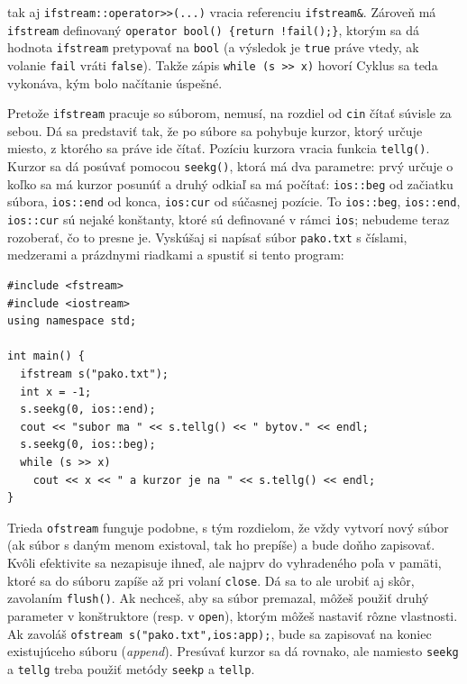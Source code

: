 \documentclass[10pt]{article}
\def\prg{\lstinline}
\def\ods{\vspace*{10pt}}
\begin{document}
{tak aj \prg!ifstream::operator>>(...)! vracia referenciu \prg!ifstream&!. Zároveň
má \prg!ifstream! definovaný \prg~operator bool() {return !fail();}~, ktorým sa dá hodnota
\prg!ifstream! pretypovať na \prg!bool! (a výsledok je \prg!true! práve vtedy,
ak volanie \prg!fail! vráti \prg!false!). Takže zápis \prg!while (s >> x)! hovorí
 Cyklus sa teda vykonáva, kým bolo načítanie úspešné.

\ods
Pretože \prg!ifstream! pracuje so súborom, nemusí, na rozdiel od \prg!cin! čítať súvisle
za sebou. Dá sa predstaviť tak, že po súbore sa pohybuje kurzor, ktorý určuje miesto, z ktorého
sa práve ide čítať. Pozíciu kurzora vracia funkcia \prg!tellg()!. Kurzor sa dá posúvať
pomocou \prg!seekg()!, ktorá má dva parametre: prvý určuje o koľko sa má kurzor posunúť
a druhý odkiaľ sa má počítať: \prg!ios::beg! od začiatku súbora, \prg!ios::end! od konca, 
\prg!ios:cur! od súčasnej pozície. 
To \prg!ios::beg!, \prg!ios::end!, \prg!ios::cur! sú nejaké
konštanty, ktoré sú definované
v rámci {\tt ios}; nebudeme teraz rozoberať, čo to presne je.
Vyskúšaj si napísať súbor {\tt pako.txt} s číslami,
medzerami a prázdnymi riadkami a spustiť si tento program:

\begin{lstlisting}
#include <fstream>
#include <iostream>
using namespace std;

int main() {
  ifstream s("pako.txt");
  int x = -1;
  s.seekg(0, ios::end);
  cout << "subor ma " << s.tellg() << " bytov." << endl;
  s.seekg(0, ios::beg);
  while (s >> x)
    cout << x << " a kurzor je na " << s.tellg() << endl;
}
\end{lstlisting}

\ods
Trieda \prg!ofstream! funguje podobne, 
s tým rozdielom, že vždy vytvorí nový súbor (ak súbor s daným
menom existoval, tak ho prepíše) a bude doňho zapisovať. Kvôli efektivite sa nezapisuje ihneď,
ale najprv do vyhradeného poľa v pamäti, ktoré sa do súboru zapíše až pri volaní \prg!close!.
Dá sa to ale urobiť aj skôr, zavolaním \prg!flush()!. Ak nechceš, aby sa súbor premazal,
môžeš použiť druhý parameter v konštruktore (resp. v \prg!open!), ktorým môžeš nastaviť
rôzne vlastnosti. Ak zavoláš \prg!ofstream s("pako.txt",ios:app);!, bude sa zapisovať na
koniec existujúceho súboru ({\em append}). Presúvať kurzor sa dá rovnako, ale namiesto
\prg!seekg! a \prg!tellg! treba použiť metódy \prg!seekp! a \prg!tellp!.

}
\end{document}
